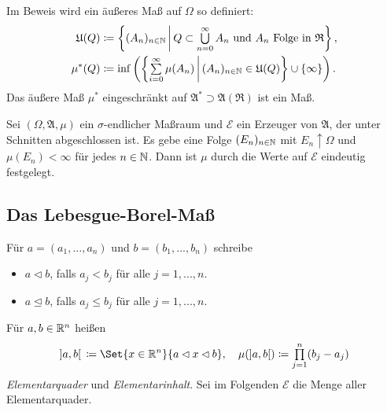 \documentclass{cheat-sheet}
\newcommand{\Alg}{\mathfrak{A}} %
\newcommand{\Ring}{\mathfrak{R}} %
\begin{document}
\begin{bem}
  Im Beweis wird ein äußeres Maß auf $\Omega$ so definiert:
  \begin{align*}
    \mathfrak{U}(Q) &\coloneqq \left\{ (A_n)_{n \in \N} \,\middle|\, Q \subset \bigcup_{n = 0}^\infty A_n \text{ und } A_n \text{ Folge in } \Ring \right\}, \\
    \mu^*(Q) &\coloneqq \inf \left( \left\{ \sum_{i = 0}^\infty \mu(A_n) \,\middle|\, (A_n)_{n \in \N} \in \mathfrak{U}(Q) \right\} \cup \{ \infty \} \right).
  \end{align*}
  Das äußere Maß $\mu^*$ eingeschränkt auf $\Alg^* \supset \Alg(\Ring)$ ist ein Maß.
\end{bem}

\begin{satz}
  Sei $(\Omega, \Alg, \mu)$ ein $\sigma$-endlicher Maßraum und $\mathcal{E}$ ein Erzeuger von $\Alg$, der unter Schnitten abgeschlossen ist. Es gebe eine Folge $(E_n)_{n \in \mathbb{N}}$ mit $E_n \uparrow \Omega$ und $\mu(E_n) < \infty$ für jedes $n \in \mathbb{N}$. Dann ist $\mu$ durch die Werte auf $\mathcal{E}$ eindeutig festgelegt.
\end{satz}

\begin{samepage}

\subsection{Das Lebesgue-Borel-Maß}

\begin{nota}
  Für $a = (a_1, ..., a_n)$ und $b = (b_1, ..., b_n)$ schreibe
  \begin{itemize}
    \item $a \lhd b$, falls $a_j < b_j$ für alle $j = 1, ..., n$.
    \item $a \unlhd b$, falls $a_j \leq b_j$ für alle $j = 1, ..., n$.
  \end{itemize}
\end{nota}

\end{samepage}

\begin{defn}
  Für $a, b \in \mathbb{R}^n$ heißen
  \[
    \left]a, b\right[\,\coloneqq \Set{ x \in \R^n }{ a \lhd x \lhd b }, \quad
    \mu(\left]a, b\right[) \coloneqq \prod_{j = 1}^{n} (b_j - a_j)
  \]
  \emph{Elementarquader} und \emph{Elementarinhalt}. Sei im Folgenden $\mathcal{E}$ die Menge aller Elementarquader.
\end{defn}
\end{document}
